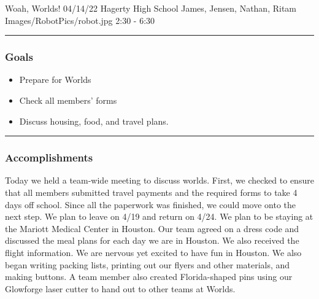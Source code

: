 \insertmeeting 
	{Woah, Worlds!} 
	{04/14/22} 
	{Hagerty High School}
	{James, Jensen, Nathan, Ritam}
	{Images/RobotPics/robot.jpg}
	{2:30 - 6:30}
	
\noindent\hfil\rule{\textwidth}{.4pt}\hfil
\subsubsection*{Goals}
\begin{itemize}
    \item Prepare for Worlds
    \item Check all members' forms
    \item Discuss housing, food, and travel plans.

\end{itemize} 

\noindent\hfil\rule{\textwidth}{.4pt}\hfil

\subsubsection*{Accomplishments}
Today we held a team-wide meeting to discuss worlds. First, we checked to ensure that all members submitted travel payments and the required forms to take 4 days off school. Since all the paperwork was finished, we could move onto the next step. We plan to leave on 4/19 and return on 4/24. We plan to be staying at the Mariott Medical Center in Houston. Our team agreed on a dress code and discussed the meal plans for each day we are in Houston. We also received the flight information. We are nervous yet excited to have fun in Houston. We also began writing packing lists, printing out our flyers and other materials, and making buttons. A team member also created Florida-shaped pins using our Glowforge laser cutter to hand out to other teams at Worlds. 

